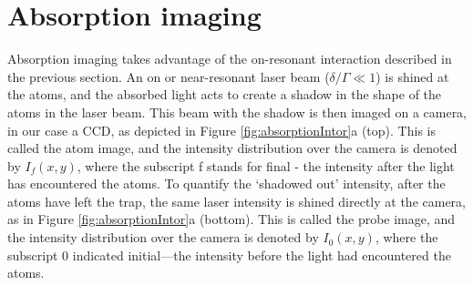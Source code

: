 \section{Absorption imaging}\label{sec:absorptionImaging}

Absorption imaging takes advantage of the on-resonant interaction described in the previous section. An on or near-resonant laser beam ($\delta/\Gamma\ll 1$) is shined at the atoms, and the absorbed light acts to create a shadow in the shape of the atoms in the laser beam. This beam with the shadow is then imaged on a camera, in our case a CCD, as depicted in Figure \ref{fig:absorptionIntor}a (top). This is called the atom image, and the intensity distribution over the camera is denoted by $I_f(x,y)$, where the subscript f stands for final - the intensity after the light has encountered the atoms. To quantify the \lq{shadowed out}\rq{} intensity, after the atoms have left the trap, the same laser intensity is shined directly at the camera, as in Figure \ref{fig:absorptionIntor}a (bottom).   This is called the probe image, and the intensity distribution over the camera is denoted by $I_0(x,y)$, where the subscript 0 indicated initial---the intensity before the light had encountered the atoms.



